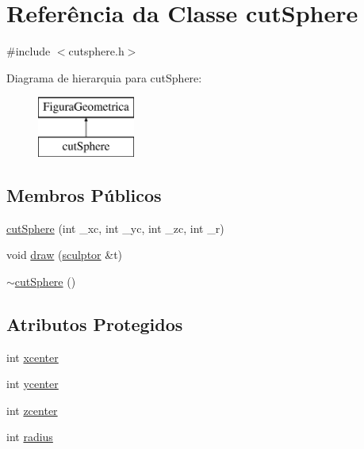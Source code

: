\hypertarget{classcut_sphere}{}\section{Referência da Classe cut\+Sphere}
\label{classcut_sphere}


{\ttfamily \#include $<$cutsphere.\+h$>$}

Diagrama de hierarquia para cut\+Sphere\+:\begin{figure}[H]
\begin{center}
\leavevmode
\includegraphics[height=2.000000cm]{classcut_sphere}
\end{center}
\end{figure}
\subsection*{Membros Públicos}
\begin{DoxyCompactItemize}
\item 
\mbox{\hyperlink{classcut_sphere_a5fb115ed9c9fbeed015b247910036d61}{cut\+Sphere}} (int \+\_\+xc, int \+\_\+yc, int \+\_\+zc, int \+\_\+r)
\item 
void \mbox{\hyperlink{classcut_sphere_a647eb845a169437c5c336bdcb282b075}{draw}} (\mbox{\hyperlink{classsculptor}{sculptor}} \&t)
\item 
\mbox{\hyperlink{classcut_sphere_acc41c446f3ae38d39b18b7b08e34f236}{$\sim$cut\+Sphere}} ()
\end{DoxyCompactItemize}
\subsection*{Atributos Protegidos}
\begin{DoxyCompactItemize}
\item 
int \mbox{\hyperlink{classcut_sphere_abc9077d50df05196d90450598bccff14}{xcenter}}
\item 
int \mbox{\hyperlink{classcut_sphere_add926dd22a432d2e369af86885b06118}{ycenter}}
\item 
int \mbox{\hyperlink{classcut_sphere_a6aee9641be3fe4586d21554291260003}{zcenter}}
\item 
int \mbox{\hyperlink{classcut_sphere_ae9fae77b83fad1abf662d7dfeae81fb0}{radius}}
\end{DoxyCompactItemize}


